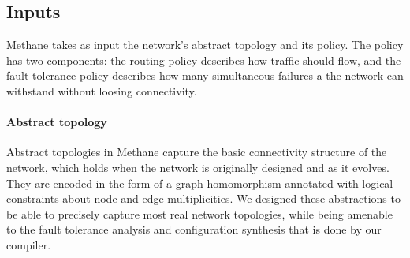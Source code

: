 \documentclass[numbers, 10pt, preprint]{sigplanconf}
\newcommand{\ryan}[1]{\textcolor{green}{[ryan: #1]}}
\newcommand{\EG}{\emph{e.g.}}
\newcommand{\IE}{\emph{i.e.}}
\newcommand{\sysname}{{\small \sf Methane}\xspace}
\newcommand{\para}[1]{\paragraph*{\textbf{#1}}}
\newcommand{\KW}[1]{\texttt{\small\bfseries{#1}}}
\newcommand{\Define}{\KW{define}}
\newcommand{\Agg}{\KW{agg}}
\newcommand{\In}{\KW{in}}
\newcommand{\Out}{\KW{out}}
\begin{document}




\subsection{Inputs}

\sysname takes as input the network's abstract topology and its policy. The policy has two components: the routing policy describes how traffic should flow, and the fault-tolerance policy describes how many simultaneous failures a the network can withstand without loosing connectivity. 
 
\para{Abstract topology}
Abstract topologies in \sysname capture the basic connectivity structure of the network, which holds when the network is originally designed and as it evolves. They are encoded in the form of a graph homomorphism annotated with logical constraints about node and edge multiplicities. We designed these abstractions to be able to precisely capture most real network topologies, while being amenable to the fault tolerance analysis and configuration synthesis that is done by our compiler.
\end{document}
